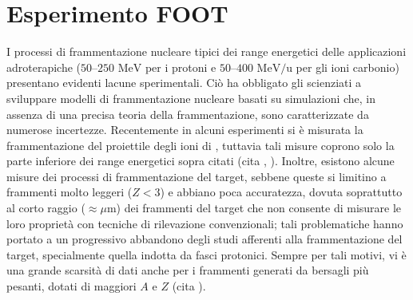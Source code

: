 \documentclass[12pt,a4paper,twoside]{report}
\begin{document}
	\chapter{Esperimento FOOT}
	I processi di frammentazione nucleare tipici dei range energetici delle applicazioni adroterapiche ($50$--$250\mbox{ MeV}$ per i protoni e $50$--$400\mbox{ MeV/u}$ per gli ioni carbonio) presentano evidenti lacune sperimentali. Ciò ha obbligato gli scienziati a sviluppare modelli di frammentazione nucleare basati su simulazioni che, in assenza di una precisa teoria della frammentazione, sono caratterizzate da numerose incertezze. Recentemente in alcuni esperimenti si è misurata la frammentazione del proiettile degli ioni di , tuttavia tali misure coprono solo la parte inferiore dei range energetici sopra citati (cita
	,
	). Inoltre, esistono alcune misure dei processi di frammentazione del target, sebbene queste si limitino a frammenti molto leggeri ($Z<3$) e abbiano poca accuratezza, dovuta soprattutto al corto raggio ($\approx\mu\mbox{m}$) dei frammenti del target che non consente di misurare le loro proprietà con tecniche di rilevazione convenzionali; tali problematiche hanno portato a un progressivo abbandono degli studi afferenti alla frammentazione del target, specialmente quella indotta da fasci protonici. Sempre per tali motivi, vi è una grande scarsità di dati anche per i frammenti generati da bersagli più pesanti, dotati di maggiori $A$ e $Z$ (cita
	).
	
\end{document}
